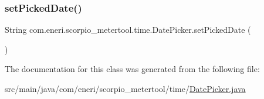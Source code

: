 \mbox{\label{classcom_1_1eneri_1_1scorpio__metertool_1_1time_1_1_date_picker_ad4e83128f4402848acd38feaa10569cf}} 
\subsubsection{\texorpdfstring{set\+Picked\+Date()}{setPickedDate()}}
{\footnotesize\ttfamily String com.\+eneri.\+scorpio\+\_\+metertool.\+time.\+Date\+Picker.\+set\+Picked\+Date (\begin{DoxyParamCaption}{ }\end{DoxyParamCaption})}



The documentation for this class was generated from the following file\+:\begin{DoxyCompactItemize}
\item 
src/main/java/com/eneri/scorpio\+\_\+metertool/time/\hyperlink{_date_picker_8java}{Date\+Picker.\+java}\end{DoxyCompactItemize}
